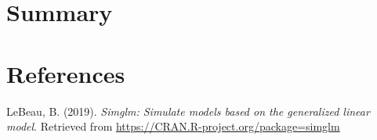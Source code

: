 \documentclass[man]{apa6}
\begin{document}
\hypertarget{summary}{%
\section{Summary}\label{summary}}

\newpage

\hypertarget{references}{%
\section{References}\label{references}}

\begingroup
\setlength{\parindent}{-0.5in}
\setlength{\leftskip}{0.5in}

\hypertarget{refs}{}
\leavevmode\hypertarget{ref-simglm}{}%
LeBeau, B. (2019). \emph{Simglm: Simulate models based on the generalized linear model}. Retrieved from \url{https://CRAN.R-project.org/package=simglm}

\endgroup
\end{document}
